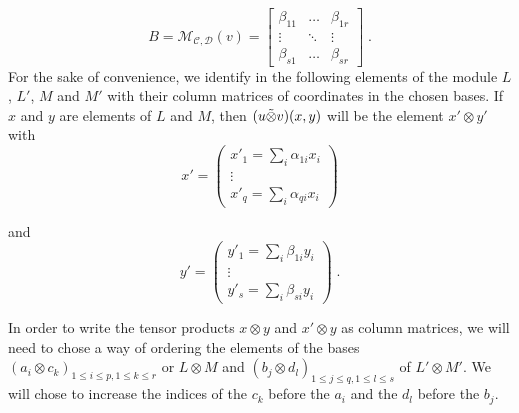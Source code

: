 \documentclass{report}
\theoremstyle{definition}
\theoremstyle{remark}
\begin{document}
    \begin{equation*}
        B=\mathcal{M}_{\mathcal{C}, \mathcal{D}}(v) = \begin{bmatrix}
        \beta_{11} & \dots &   \beta_{1r} \\
        \vdots & \ddots & \vdots \\
        \beta_{s1} & \dots & \beta_{sr}
        \end{bmatrix}\;.
    \end{equation*}
    For the sake of convenience, we identify in the following elements of the module $L$, $L'$, $M$ and $M'$ with their column matrices of coordinates in the chosen bases. If $x$ and $y$ are elements of $L$ and $M$, then $(u\Tilde{\otimes} v) (x,y)$ will be the element $x'\otimes y'$ with 
    \begin{equation*}
        x' = 
        \begin{pmatrix}
        x'_1 = \sum_i \alpha_{1i}x_i\\
        \vdots \\
        x'_q = \sum_i \alpha_{qi}x_i
        \end{pmatrix}
    \end{equation*}
    
    and 
    \begin{equation*}
        y' = 
        \begin{pmatrix}
        y'_1 = \sum_i \beta_{1i}y_i \\
        \vdots \\
        y'_s = \sum_i \beta_{si}y_i
        \end{pmatrix}\;.
    \end{equation*} 
    
  
    In order to write the tensor products $x \otimes y$ and $x' \otimes y$ as column matrices, we will need to chose a way of ordering the elements of the bases $(a_i \otimes c_k)_{1\leq i \leq p, 1\leq k \leq r}$ or $L \otimes M$ and $ (b_j \otimes d_l)_{1 \leq j \leq q, 1 \leq l \leq s} $ of $L'\otimes M'$.
    We will chose to increase the indices of the $c_k$ before the $a_i$ and the $d_l$ before the $b_j$.
    
\end{document}
